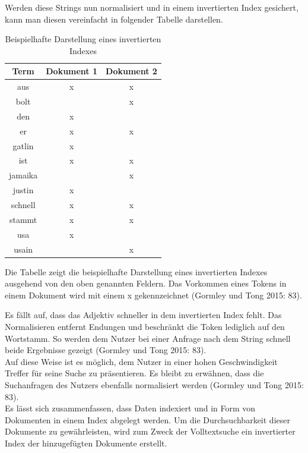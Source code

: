 \documentclass[a4paper]{scrartcl}
\begin{document}
Werden diese Strings nun normalisiert und in einem invertierten Index gesichert, kann man diesen vereinfacht in folgender Tabelle darstellen.

\begin{table}[htb]
	\centering
	\caption{Beispielhafte Darstellung eines invertierten Indexes}
	\begin{center}
		
		\begin{tabular}{| c | c | c |}
			\hline
			Term & Dokument 1 & Dokument 2 \\ [0.5ex]
			\hline \hline
			aus & x & x \\
			\hline
			bolt & & x \\
			\hline
			den & x & \\
			\hline
			er & x & x \\
			\hline
			gatlin & x & \\
			\hline
			ist & x & x \\
			\hline
			jamaika & & x \\
			\hline
			justin & x & \\
			\hline
			schnell & x & x \\
			\hline
			stammt & x & x \\
			\hline
			usa & x &  \\
			\hline
			usain & & x\\
			\hline
		\end{tabular}
	\end{center}
	Die Tabelle zeigt die beispielhafte Darstellung eines invertierten Indexes ausgehend von den oben genannten Feldern. Das Vorkommen eines Tokens in einem Dokument wird mit einem x gekennzeichnet (Gormley und Tong 2015: 83).
\end{table}

Es fällt auf, dass das Adjektiv schneller in dem invertierten Index fehlt. Das Normalisieren entfernt Endungen und beschränkt die Token lediglich auf den Wortstamm. So werden dem Nutzer bei einer Anfrage nach dem String schnell beide Ergebnisse gezeigt (Gormley und Tong 2015: 83). \\
Auf diese Weise ist es möglich, dem Nutzer in einer hohen Geschwindigkeit Treffer für seine Suche zu präsentieren. Es bleibt zu erwähnen, dass die Suchanfragen des Nutzers ebenfalls normalisiert werden (Gormley und Tong 2015: 83). \\

Es lässt sich zusammenfassen, dass Daten indexiert und in Form von Dokumenten in einem Index abgelegt werden. Um die Durchsuchbarkeit dieser Dokumente zu gewährleisten, wird zum Zweck der Volltextsuche ein invertierter Index der hinzugefügten Dokumente erstellt.
\end{document}
